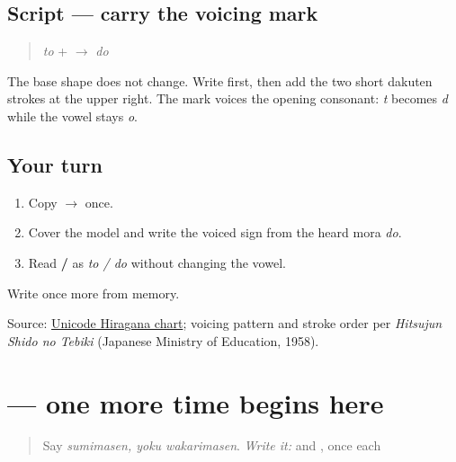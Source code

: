 \subsection*{Script — carry the voicing mark}

\begin{quote}
\textbf{} \emph{to} + \textbf{} $\to$ \textbf{} \emph{do}
\end{quote}

The base shape does not change. Write \textbf{} first, then add the two short dakuten strokes at the upper right. The mark voices the opening consonant: \emph{t} becomes \emph{d} while the vowel stays \emph{o}.

\subsection*{Your turn}
\begin{enumerate}
\raggedright
  \item Copy \textbf{ $\to$ } once.
  \item Cover the model and write the voiced sign from the heard mora \emph{do}.
  \item Read \textbf{ / } as \emph{to / do} without changing the vowel.
\end{enumerate}

\begin{tcolorbox}[breakable,colback=teal!4,colframe=teal!35!black,title={Before you move on}]
Write \textbf{} once more from memory.

Source: \href{https://www.unicode.org/charts/PDF/U3040.pdf}{Unicode Hiragana chart}; voicing pattern and stroke order per \emph{Hitsujun Shido no Tebiki} (Japanese Ministry of Education, 1958).
\end{tcolorbox}
\section[\texorpdfstring{\ja{もう} (mō)}{もう (mō)}]{ — one more time begins here}

\label{lesson:JA-C09-mou}



\begin{quote}
Say \emph{sumimasen, yoku wakarimasen}. \emph{Write it:} \textbf{} and \textbf{}, once each
\end{quote}

